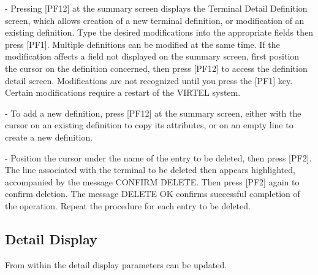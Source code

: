 \documentclass[letterpaper,10pt,english]{sphinxmanual}
\begin{document}
 - Pressing {[}PF12{]} at the summary screen displays the Terminal Detail Definition screen, which allows creation of a new terminal definition, or modification of an existing definition. Type the desired modifications into the appropriate fields then press {[}PF1{]}. Multiple definitions can be modified at the same time. If the modification affects a field not displayed on the summary screen, first position the cursor on the definition concerned, then press {[}PF12{]} to access the definition detail screen. Modifications are not recognized until you press the {[}PF1{]} key. Certain modifications require a restart of the VIRTEL
system.

 - To add a new definition, press {[}PF12{]} at the summary screen, either with the cursor on an existing definition to copy its attributes, or on an empty line to create a new definition.

 - Position the cursor under the name of the entry to be deleted, then press {[}PF2{]}. The line associated with the terminal to be deleted then appears highlighted, accompanied by the message CONFIRM DELETE. Then press {[}PF2{]} again to confirm deletion. The message DELETE OK confirms successful completion of the operation. Repeat the procedure for each entry to be deleted.

\ignorespaces 

\subsection{Detail Display}
\label{\detokenize{connectivity_guide:index-99}}\label{\detokenize{connectivity_guide:id52}}

From within the detail display parameters can be updated.

\ignorespaces 
\end{document}
